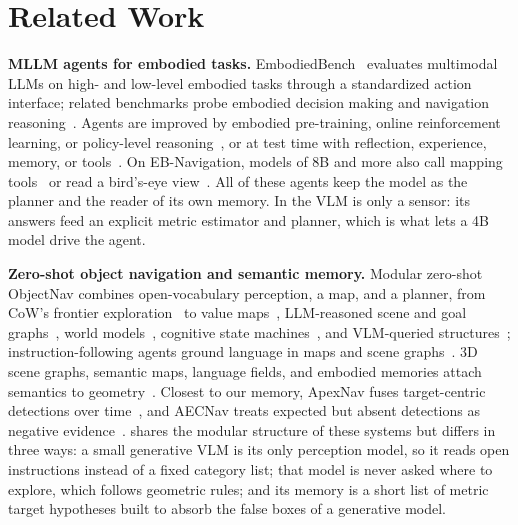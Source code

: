 \section{Related Work}
\label{sec:related}

\noindent\textbf{MLLM agents for embodied tasks.}
EmbodiedBench~\cite{yang2025embodiedbench} evaluates multimodal LLMs on high- and low-level embodied tasks through
a standardized action interface; related benchmarks probe embodied decision making and navigation
reasoning~\cite{li2024embodied,qiao2025navbench}. Agents are improved by embodied pre-training, online
reinforcement learning, or policy-level reasoning~\cite{chen2025transforming,wang2025vagen,zhang2025embodiedx,liu2025robogpt},
or at test time with reflection, experience, memory, or
tools~\cite{shinn2023reflexion,zhao2023expel,chen2024automanual,wang2024agent,lei2025robomemory,ma2026brainmem,lee2026emho,zhou2026enabling,singhi2026think}.
On EB-Navigation, models of 8B and more also call mapping tools~\cite{zhou2026enabling} or read a bird's-eye
view~\cite{wang2025seenav}. All of these agents keep the model as the planner and the reader of its own memory. In \ours the VLM is only a
sensor: its answers feed an explicit metric estimator and planner, which is what lets a 4B model drive the agent.

\noindent\textbf{Zero-shot object navigation and semantic memory.}
Modular zero-shot ObjectNav combines open-vocabulary perception, a map, and a planner, from CoW's frontier
exploration~\cite{gadre2022cows} to value maps~\cite{yokoyama2023vlfm}, LLM-reasoned scene and goal
graphs~\cite{yin2024online,huang2025msgnav,yin2025unigoal}, world models~\cite{nie2025wmnav}, cognitive state
machines~\cite{cao2024cognav}, and VLM-queried structures~\cite{zhu2025strive}; instruction-following agents ground
language in maps and scene graphs~\cite{long2024instructnav,rana2023sayplan,werby2024hierarchical}. 3D scene graphs, semantic maps, language
fields, and embodied memories attach semantics to geometry~\cite{gu2023conceptgraphs,jiang2025dualmap,qin2023langsplat,katragadda2025online,lee2026embodiedsplat,yang2024scene,anwar2024remembr,ginting2025enter}. Closest to our memory,
ApexNav fuses target-centric detections over time~\cite{zhang2025apexnav}, and AECNav treats expected but absent
detections as negative evidence~\cite{liu2026aecnav}. \ours shares the modular structure of these systems but differs in
three ways: a small generative VLM is its only perception model, so it reads open instructions instead of a fixed
category list; that model is never asked where to explore, which follows geometric rules; and its memory is a short
list of metric target hypotheses built to absorb the false boxes of a generative model.

